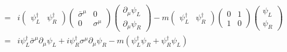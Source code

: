 \begin{subappendices}
\begin{align}
=&i\begin{pmatrix}
 \psi_L^\dagger & \psi_R^\dagger
\end{pmatrix}
 \begin{pmatrix}
   \bar{\sigma}^\mu &0\\
   0&\sigma^\mu
 \end{pmatrix} \begin{pmatrix}
   \partial_\mu\psi_L\\
   \partial_\mu\psi_R
 \end{pmatrix}-m
 \begin{pmatrix}
   \psi_L^\dagger&\psi_R^\dagger
 \end{pmatrix}
 \begin{pmatrix}
   0&1\\
   1&0
 \end{pmatrix}
 \begin{pmatrix}
   \psi_L\\ \psi_R
 \end{pmatrix}\nonumber\\
 =& i\psi_L^\dagger \bar{\sigma}^\mu\partial_\mu\psi_L+i\psi_R^\dagger \sigma^\mu\partial_\mu\psi_R
  -m(\psi_L^\dagger \psi_R+\psi_R^\dagger \psi_L)
\end{align}


\end{subappendices}
